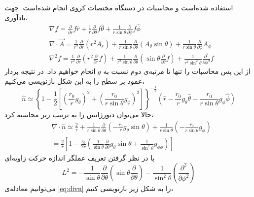 استفاده شده‌است و محاسبات در دستگاه مختصات کروی انجام شده‌است.
جهت یادآوری،
\begin{equation}
\begin{aligned}
&\nabla f =\frac{\partial}{\partial r}f\hat r + \frac{1}{r} \frac{\partial}{\partial\theta}f\hat\theta+ \frac{1}{r\sin\theta} \frac{\partial}{\partial\phi}f\hat\phi\\
&\nabla\cdot \vec A =\frac{1}{r^2}\frac{\partial}{\partial r}(r^2A_r)+ \frac{1}{r\sin\theta} \frac{\partial}{\partial\theta}(A_\theta\sin\theta)+ \frac{1}{r\sin\theta} \frac{\partial}{\partial\phi}A_\phi\\
&\nabla^2f =\frac{1}{r^2}\frac{\partial}{\partial r}\left(r^2\frac{\partial}{\partial r}f\right)+ \frac{1}{r^2\sin\theta} \frac{\partial}{\partial\theta}\left(\sin\theta\frac{\partial}{\partial\theta}f\right)+ \frac{1}{r^2\sin^2\theta} \frac{\partial^2}{\partial\phi^2}f
\end{aligned}
\end{equation}
از این پس محاسبات را تنها تا مرتبه‌ی دوم نسبت به $g$ 
انجام خواهیم داد. در نتیجه بردار عمود بر سطح را به این شکل بازنویسی می‌کنیم،
\begin{equation}
\hat n \simeq\left\{1-\frac{1}{2}\left[\left(\frac{r_0}{r}g_\theta\right)^2+\left(\frac{r_0}{r\sin\theta}g_\phi\right)^2 \right]\right\}^{-\frac{1}{2}}\left( \hat r-\frac{r_0}{r}g_\theta \hat\theta-\frac{r_0}{r\sin\theta}g_\phi\hat\phi \right)
\end{equation}
حالا می‌توان دیورژانس را به ترتیب زیر محاسبه کرد،
\begin{equation}
\begin{aligned}
&\nabla\cdot\hat n \simeq \frac{2}{r}+\frac{1}{r\sin\theta}\frac{\partial}{\partial\theta}\left(-\frac{r_0}{r}g_\theta\sin\theta\right)+\frac{1}{r\sin\theta}\left(-\frac{r_0}{r\sin\theta}g_\phi\right)\\
&=\frac{2}{r}\left[1-\frac{r_0}{2r}\left(\frac{1}{\sin\theta}\frac{\partial}{\partial\theta}g_\theta\sin\theta+\frac{1}{\sin^2\theta}g_{\phi\phi}\right)\right]
\label{eq:divn}
\end{aligned}
\end{equation}
با در نظر گرفتن تعریف عملگر اندازه حرکت زاویه‌ای 
\begin{equation}
L^2=-\frac{1}{\sin\theta}\frac{\partial}{\partial\theta}\left(\sin\theta\frac{\partial}{\partial\theta}\right)-\frac{1}{\sin^2\theta}\left(\frac{\partial^2}{\partial\phi^2}\right)
\end{equation}
می‌توانیم معادله‌ی
\ref{eq:divn}
را به شکل زیر بازنویسی کنیم،
